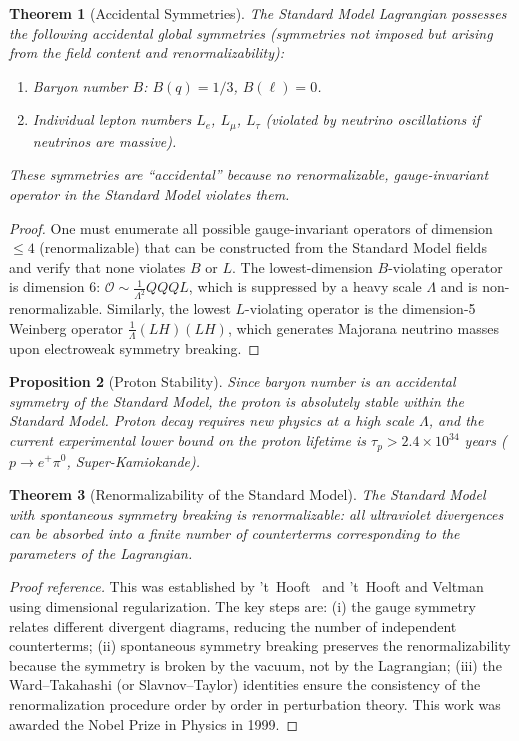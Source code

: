 \documentclass[12pt]{article}
\newtheorem{theorem}{Theorem}[section]
\newtheorem{proposition}[theorem]{Proposition}
\theoremstyle{definition}
\theoremstyle{remark}
\begin{document}
\begin{theorem}[Accidental Symmetries]
\label{thm:accidental}
The Standard Model Lagrangian possesses the following accidental global symmetries (symmetries not imposed but arising from the field content and renormalizability):
\begin{enumerate}
    \item Baryon number $B$: $B(q) = 1/3$, $B(\ell) = 0$.
    \item Individual lepton numbers $L_e$, $L_\mu$, $L_\tau$ (violated by neutrino oscillations if neutrinos are massive).
\end{enumerate}
These symmetries are ``accidental'' because no renormalizable, gauge-invariant operator in the Standard Model violates them.
\end{theorem}

\begin{proof}
One must enumerate all possible gauge-invariant operators of dimension $\leq 4$ (renormalizable) that can be constructed from the Standard Model fields and verify that none violates $B$ or $L$. The lowest-dimension $B$-violating operator is dimension 6: $\mathcal{O} \sim \frac{1}{\Lambda^2} QQQL$, which is suppressed by a heavy scale $\Lambda$ and is non-renormalizable. Similarly, the lowest $L$-violating operator is the dimension-5 Weinberg operator $\frac{1}{\Lambda}(LH)(LH)$, which generates Majorana neutrino masses upon electroweak symmetry breaking.
\end{proof}

\begin{proposition}[Proton Stability]
\label{prop:protonstability}
Since baryon number is an accidental symmetry of the Standard Model, the proton is absolutely stable within the Standard Model. Proton decay requires new physics at a high scale $\Lambda$, and the current experimental lower bound on the proton lifetime is $\tau_p > 2.4 \times 10^{34}$ years ($p \to e^+ \pi^0$, Super-Kamiokande).
\end{proposition}

\begin{theorem}[Renormalizability of the Standard Model]
\label{thm:renormalizability}
The Standard Model with spontaneous symmetry breaking is renormalizable: all ultraviolet divergences can be absorbed into a finite number of counterterms corresponding to the parameters of the Lagrangian.
\end{theorem}

\begin{proof}[Proof reference]
This was established by 't~Hooft~\cite{tHooft1971} and 't~Hooft and Veltman~\cite{tHooftVeltman1972} using dimensional regularization. The key steps are: (i) the gauge symmetry relates different divergent diagrams, reducing the number of independent counterterms; (ii) spontaneous symmetry breaking preserves the renormalizability because the symmetry is broken by the vacuum, not by the Lagrangian; (iii) the Ward--Takahashi (or Slavnov--Taylor) identities ensure the consistency of the renormalization procedure order by order in perturbation theory. This work was awarded the Nobel Prize in Physics in 1999.
\end{proof}
\end{document}
